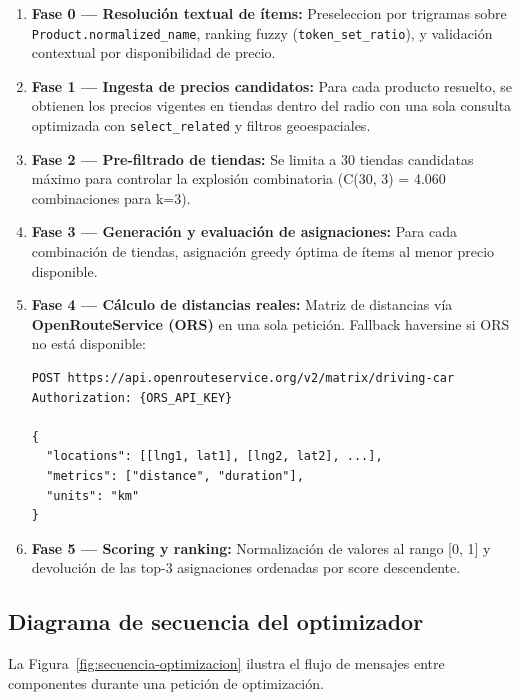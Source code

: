 \begin{enumerate}
  \item \textbf{Fase 0 --- Resoluci\'on textual de \'items:} Preseleccion por trigramas sobre
    \texttt{Product.normalized\_name}, ranking fuzzy (\texttt{token\_set\_ratio}), y validaci\'on
    contextual por disponibilidad de precio.

  \item \textbf{Fase 1 --- Ingesta de precios candidatos:} Para cada producto resuelto, se
    obtienen los precios vigentes en tiendas dentro del radio con una sola consulta optimizada
    con \texttt{select\_related} y filtros geoespaciales.

  \item \textbf{Fase 2 --- Pre-filtrado de tiendas:} Se limita a 30 tiendas candidatas m\'aximo
    para controlar la explosi\'on combinatoria (C(30, 3) = 4.060 combinaciones para k=3).

  \item \textbf{Fase 3 --- Generaci\'on y evaluaci\'on de asignaciones:} Para cada combinaci\'on
    de tiendas, asignaci\'on greedy \'optima de \'items al menor precio disponible.

  \item \textbf{Fase 4 --- C\'alculo de distancias reales:} Matriz de distancias v\'ia
    \textbf{OpenRouteService (ORS)} en una sola petici\'on. Fallback haversine si ORS no est\'a
    disponible:

\begin{verbatim}
POST https://api.openrouteservice.org/v2/matrix/driving-car
Authorization: {ORS_API_KEY}

{
  "locations": [[lng1, lat1], [lng2, lat2], ...],
  "metrics": ["distance", "duration"],
  "units": "km"
}
\end{verbatim}

  \item \textbf{Fase 5 --- Scoring y ranking:} Normalizaci\'on de valores al rango [0, 1] y
    devoluci\'on de las top-3 asignaciones ordenadas por score descendente.
\end{enumerate}

\subsection{Diagrama de secuencia del optimizador}\label{subsec:secuencia-optimizador}

La Figura~\ref{fig:secuencia-optimizacion} ilustra el flujo de mensajes entre componentes
durante una petici\'on de optimizaci\'on.

